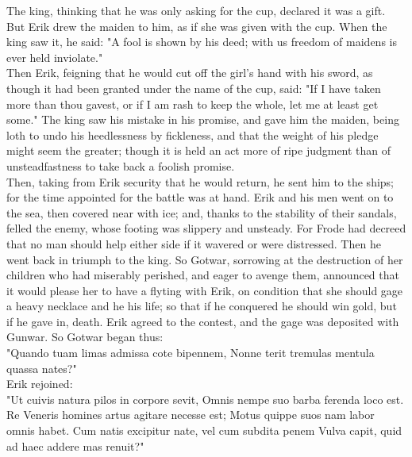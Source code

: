 \documentclass[10pt,a4paper]{report}
\begin{document}
The king, thinking that he was only asking for the cup, declared it was a gift. But Erik drew the maiden to him, as if she was given with the cup. When the king saw it, he said: "A fool is shown by his deed; with us freedom of maidens is ever held inviolate."\\

Then Erik, feigning that he would cut off the girl's hand with his sword, as though it had been granted under the name of the cup, said: "If I have taken more than thou gavest, or if I am rash to keep the whole, let me at least get some." The king saw his mistake in his promise, and gave him the maiden, being loth to undo his heedlessness by fickleness, and that the weight of his pledge might seem the greater; though it is held an act more of ripe judgment than of unsteadfastness to take back a foolish promise.\\

Then, taking from Erik security that he would return, he sent him to the ships; for the time appointed for the battle was at hand. Erik and his men went on to the sea, then covered near with ice; and, thanks to the stability of their sandals, felled the enemy, whose footing was slippery and unsteady. For Frode had decreed that no man should help either side if it wavered or were distressed. Then he went back in triumph to the king. So Gotwar, sorrowing at the destruction of her children who had miserably perished, and eager to avenge them, announced that it would please her to have a flyting with Erik, on condition that she should gage a heavy necklace and he his life; so that if he conquered he should win gold, but if he gave in, death. Erik agreed to the contest, and the gage was deposited with Gunwar. So Gotwar began thus:\\

    \indent "Quando tuam limas admissa cote bipennem,
    \indent Nonne terit tremulas mentula quassa nates?"\\

Erik rejoined:\\

    \indent "Ut cuivis natura pilos in corpore sevit,
    \indent Omnis nempe suo barba ferenda loco est.
    \indent Re Veneris homines artus agitare necesse est;
    \indent Motus quippe suos nam labor omnis habet.
    \indent Cum natis excipitur nate, vel cum subdita penem
    \indent Vulva capit, quid ad haec addere mas renuit?"\\
\end{document}
